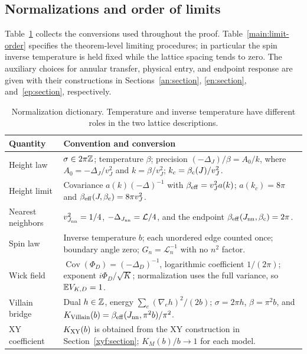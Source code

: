 \subsection{Normalizations and order of limits}

Table~\ref{main:normalizations} collects the conversions used throughout
the proof.  Table~\ref{main:limit-order} specifies the theorem-level
limiting procedures; in particular the spin inverse temperature is
held fixed while the lattice spacing tends to zero.  The auxiliary
choices for annular transfer, physical entry, and endpoint response
are given with their constructions in Sections~\ref{an:section},
\ref{en:section}, and~\ref{ep:section}, respectively.

\begin{table}[htbp]
\centering\small
\begin{tabular}{@{}p{}p{}@{}}
\toprule
Quantity & Convention and conversion \\
\midrule
Height law & $\sigma\in2\pi\mathbb Z$; temperature $\beta$;
precision $(-\Delta_J)/\beta=A_0/k$, where
$A_0=-\Delta_J/v_J^2$ and $k=\beta/v_J^2$;
$k_c=\beta_{\mathrm c}(J)/v_J^2$. \\[3pt]
Height limit & Covariance $a(k)(-\Delta)^{-1}$ with
$\beta_{\mathrm{eff}}=v_J^2a(k)$; $a(k_c)=8\pi$ and
$\beta_{\mathrm{eff}}(J,\beta_{\mathrm c})=8\pi v_J^2$. \\[3pt]
Nearest neighbors & $v_{J_{\mathrm{nn}}}^2=1/4$,
$-\Delta_{J_{\mathrm{nn}}}=\mathcal L/4$, and the endpoint
$\beta_{\mathrm{eff}}(J_{\mathrm{nn}},\beta_{\mathrm c})=2\pi$. \\[3pt]
Spin law & Inverse temperature $b$; each unordered edge counted once;
boundary angle zero; $G_n=\mathcal L_n^{-1}$ with no $n^2$ factor. \\[3pt]
Wick field & $\operatorname{Cov}(\Phi_D)=(-\Delta_D)^{-1}$,
logarithmic coefficient $1/(2\pi)$; exponent $i\Phi_D/\sqrt K$;
normalization uses the full variance, so $\mathbb E V_{K,D}=1$. \\[3pt]
Villain bridge & Dual $h\in\mathbb Z$, energy $\sum_e(\nabla_e h)^2/(2b)$;
$\sigma=2\pi h$, $\beta=\pi^2b$, and
$K_{\rm Villain}(b)=\beta_{\mathrm{eff}}(J_{\mathrm{nn}},\pi^2b)/\pi^2$. \\[3pt]
XY coefficient & $K_{\rm XY}(b)$ is obtained from the XY construction
in Section~\ref{xyf:section}; $K_M(b)/b\to1$ for each model. \\
\bottomrule
\end{tabular}
\caption{Normalization dictionary.  Temperature and inverse temperature
have different roles in the two lattice descriptions.}
\label{main:normalizations}
\end{table}

